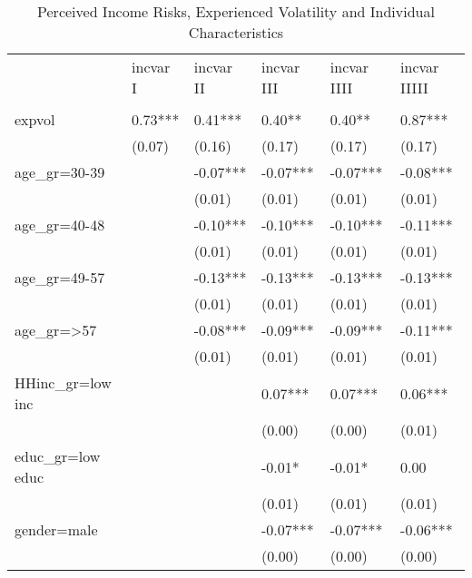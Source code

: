 \begin{table}[p]
\centering
\begin{adjustbox}{width=\textwidth}
\begin{threeparttable}
\caption{Perceived Income Risks, Experienced Volatility and Individual Characteristics}
\label{micro_reg}\begin{tabular}{llllll}
\toprule
{} & incvar I & incvar II & incvar III & incvar IIII & incvar IIIII \\
                 &          &           &            &             &              \\
\midrule
expvol           &  0.73*** &   0.41*** &     0.40** &      0.40** &      0.87*** \\
                 &   (0.07) &    (0.16) &     (0.17) &      (0.17) &       (0.17) \\
age\_gr=30-39     &          &  -0.07*** &   -0.07*** &    -0.07*** &     -0.08*** \\
                 &          &    (0.01) &     (0.01) &      (0.01) &       (0.01) \\
age\_gr=40-48     &          &  -0.10*** &   -0.10*** &    -0.10*** &     -0.11*** \\
                 &          &    (0.01) &     (0.01) &      (0.01) &       (0.01) \\
age\_gr=49-57     &          &  -0.13*** &   -0.13*** &    -0.13*** &     -0.13*** \\
                 &          &    (0.01) &     (0.01) &      (0.01) &       (0.01) \\
age\_gr=>57       &          &  -0.08*** &   -0.09*** &    -0.09*** &     -0.11*** \\
                 &          &    (0.01) &     (0.01) &      (0.01) &       (0.01) \\
HHinc\_gr=low inc &          &           &    0.07*** &     0.07*** &      0.06*** \\
                 &          &           &     (0.00) &      (0.00) &       (0.01) \\
educ\_gr=low educ &          &           &     -0.01* &      -0.01* &         0.00 \\
                 &          &           &     (0.01) &      (0.01) &       (0.01) \\
gender=male      &          &           &   -0.07*** &    -0.07*** &     -0.06*** \\
                 &          &           &     (0.00) &      (0.00) &       (0.00) \\

\end{tabular}
\end{threeparttable}
\end{adjustbox}
\end{table}
